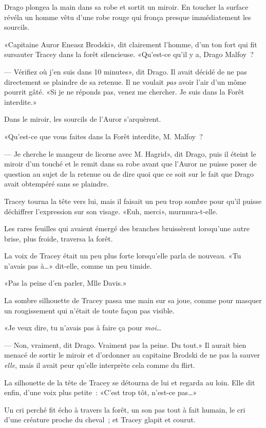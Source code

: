 Drago plongea la main dans sa robe et sortit un miroir. En toucher la surface révéla un homme vêtu d'une robe rouge qui fronça presque immédiatement les sourcils.

«Capitaine Auror Eneasz Brodski», dit clairement l'homme, d'un ton fort qui fit sursauter Tracey dans la forêt silencieuse. «Qu'est-ce qu'il y a, Drago Malfoy~?

--- Vérifiez où j'en suis dans 10 minutes», dit Drago. Il avait décidé de ne pas directement se plaindre de sa retenue. Il ne voulait \emph{pas} avoir l'air d'un môme pourrit gâté. «Si je ne réponds pas, venez me chercher. Je suis dans la Forêt interdite.»

Dans le miroir, les sourcils de l'Auror s'arquèrent.

«Qu'est-ce que vous faites dans la Forêt interdite, M. Malfoy~?

--- Je cherche le mangeur de licorne avec M. Hagrid», dit Drago, puis il éteint le miroir d'un touché et le remit dans sa robe avant que l'Auror ne puisse poser de question au sujet de la retenue ou de dire quoi que ce soit sur le fait que Drago avait obtempéré sans se plaindre.

Tracey tourna la tête vers lui, mais il faisait un peu trop sombre pour qu'il puisse déchiffrer l'expression sur son visage. «Euh, merci», murmura-t-elle.

Les rares feuilles qui avaient émergé des branches bruissèrent lorsqu'une autre brise, plus froide, traversa la forêt.

La voix de Tracey était un peu plus forte lorsqu'elle parla de nouveau. «Tu n'avais pas à…» dit-elle, comme un peu timide.

«Pas la peine d'en parler, Mlle Davis.»

La sombre silhouette de Tracey passa une main sur sa joue, comme pour masquer un rougissement qui n'était de toute façon pas visible.

«Je veux dire, tu n'avais pas à faire ça pour \emph{moi}…

--- Non, vraiment, dit Drago. Vraiment pas la peine. Du tout.» Il aurait bien menacé de sortir le miroir et d'ordonner au capitaine Brodski de ne pas la sauver \emph{elle}, mais il avait peur qu'elle interprète cela comme du flirt.

La silhouette de la tête de Tracey se détourna de lui et regarda au loin. Elle dit enfin, d'une voix plus petite~: «C'est trop tôt, n'est-ce pas…»

Un cri perché fit écho à travers la forêt, un son pas tout à fait humain, le cri d'une créature proche du cheval~; et Tracey glapit et courut.


